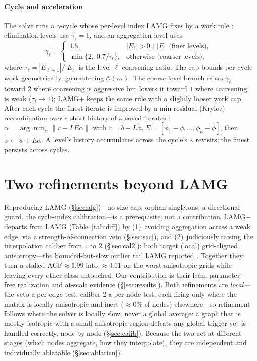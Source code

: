 \documentclass[leqno,letterpaper]{etna}
\newcommand{\Om}{\mathcal{O}(m)}
\newcommand{\acf}{\mathrm{ACF}}
\begin{document}
\paragraph{Cycle and acceleration} The solve runs a $\gamma$-cycle whose per-level index
LAMG fixes by a work rule \cite[Eq.~4.1]{lamg}: elimination levels use $\gamma_\ell=1$, and an
aggregation level uses
\begin{equation}\label{eq:gamma}
\gamma_\ell=\begin{cases}1.5, & |E_\ell|>0.1\,|E|\ \ \text{(finer levels)},\\[2pt]
\min\{2,\;0.7/\tau_\ell\}, & \text{otherwise (coarser levels)},\end{cases}
\end{equation}
where $\tau_\ell=|E_{\ell+1}|/|E_\ell|$ is the level-$\ell$ coarsening ratio. The cap bounds
per-cycle work geometrically, guaranteeing $\Om$. The coarse-level branch raises $\gamma_\ell$
toward $2$ where coarsening is aggressive but lowers it toward $1$ where coarsening is weak
($\tau_\ell\to1$); LAMG+ keeps the same rule with a slightly looser work cap.
After each cycle the finest iterate is improved by a min-residual
(Krylov) recombination over a short history of $\kappa$ saved iterates \cite[\S7.8.2]{guide}:
$\alpha=\arg\min_\alpha\|r-LE\alpha\|$ with $r = b - L \tilde\phi$, $E=[\phi_1-\tilde\phi,\dots,\phi_{\kappa}-\tilde\phi]$, then
$\tilde\phi\leftarrow \tilde\phi+E\alpha$. A level's history accumulates across the cycle's $\gamma$
revisits; the finest persists across cycles.

\section{Two refinements beyond LAMG}\label{sec:choices}
Reproducing LAMG (\S\ref{sec:alg})---no size cap, orphan singletons, a directional guard, the
cycle-index calibration---is a prerequisite, not a contribution. LAMG+ departs
from LAMG (Table~\ref{tab:diff}) by (1)~avoiding aggregation across a weak edge, via a
strength-of-connection veto (\S\ref{sec:soc}), and (2)~judiciously raising the interpolation caliber
from $1$ to $2$ (\S\ref{sec:cal2}); both target (local) grid-aligned anisotropy---the bounded-but-slow
outlier tail LAMG reported \cite[\S\S5.2,\,6.1]{lamg}. Together they turn a stalled
$\acf\approx0.99$ into $\approx0.11$ on the worst anisotropic grids while leaving every other class
untouched. Our contribution is their lean, parameter-free realization and
at-scale evidence (\S\ref{sec:results}). Both refinements are \emph{local}---the veto a per-edge
test, caliber-2 a per-node test, each firing only where the matrix is locally anisotropic and inert
($\approx\!0\%$ of nodes) elsewhere---so refinement follows where the solver is locally slow, never a
global average: a graph that is mostly isotropic with a small anisotropic region defeats any global
trigger yet is handled correctly, node by node (\S\ref{sec:calib}). Because the two act at different
stages (which nodes aggregate, how they interpolate), they are independent and individually
ablatable (\S\ref{sec:ablation}).
\end{document}
